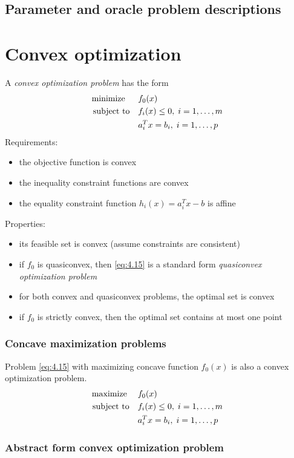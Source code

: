 \subsection{Parameter and oracle problem descriptions}

\section{Convex optimization}
A \textit{convex optimization problem} has the form
\begin{align}
  \text{minimize\;\;}\quad& f_0(x)\nonumber\\
  \text{subject to}  \quad& f_i(x)\le 0,\;i=1,\dots,m\label{eq:4.15}\\
                          & a_i^Tx =b_i,\;i=1,\dots,p\nonumber
\end{align}
Requirements:
\begin{itemize}
  \item the objective function is convex
  \item the inequality constraint functions are convex
  \item the equality constraint function $h_i(x)=a_i^Tx-b$ is affine
\end{itemize}
Properties:
\begin{itemize}
  \item its feasible set is convex (assume constraints are consistent)
  \item if $f_0$ is quasiconvex, then \eqref{eq:4.15} is a standard form \textit{quasiconvex optimization problem}
  \item for both convex and quasiconvex problems, the optimal set is convex
  \item if $f_0$ is strictly convex, then the optimal set contains at most one point
\end{itemize}
\subsubsection{Concave maximization problems}
Problem \eqref{eq:4.15} with maximizing concave function $f_0(x)$ is also a convex optimization problem.
\begin{align}
  \text{maximize\;}\quad& f_0(x)\nonumber\\
  \text{subject to}  \quad& f_i(x)\le 0,\;i=1,\dots,m\label{eq:4.16}\\
                          & a_i^Tx =b_i,\;i=1,\dots,p\nonumber
\end{align}
\subsubsection{Abstract form convex optimization problem}


